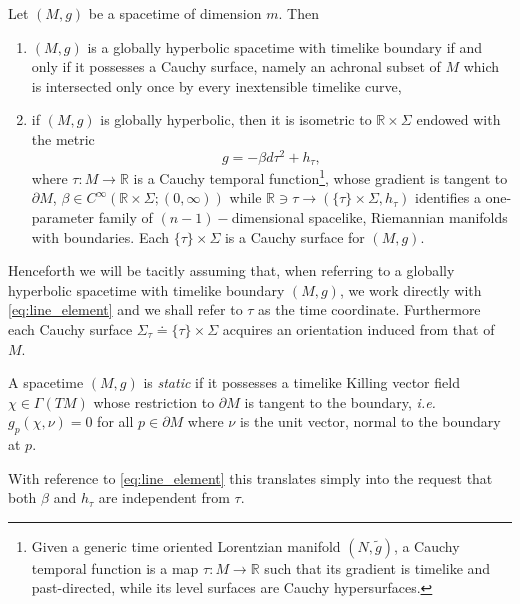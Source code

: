 \begin{theorem}
	Let $(M,g)$ be a spacetime of dimension $m$. Then 
	\begin{enumerate}
		\item $(M,g)$ is a globally hyperbolic spacetime with timelike boundary if and only if it possesses a Cauchy surface, namely an achronal subset of $M$ which is intersected only once by every inextensible timelike curve,
		\item if $(M,g)$ is globally hyperbolic, then it is isometric to $\mathbb{R}\times\Sigma$ endowed with the metric
		\begin{equation}\label{eq:line_element}
		g=-\beta d\tau^2+h_\tau,
		\end{equation}
		where $\tau:M\to\mathbb{R}$ is a Cauchy temporal function\footnote{Given a generic time oriented Lorentzian manifold $(N,\tilde{g})$, a Cauchy temporal function is a map $\tau:M\to\mathbb{R}$ such that its gradient is timelike and past-directed, while its level surfaces are Cauchy hypersurfaces.}, whose gradient is tangent to $\partial M$, $\beta\in C^\infty(\mathbb{R}\times\Sigma;(0,\infty))$ while $\mathbb{R}\ni\tau\to (\{\tau\}\times\Sigma,h_\tau)$ identifies a one-parameter family of $(n-1)-$dimensional spacelike, Riemannian manifolds with boundaries. Each $\{\tau\}\times\Sigma$ is a Cauchy surface for $(M,g)$.
	\end{enumerate}
\end{theorem}


Henceforth we will be tacitly assuming that, when referring to a globally hyperbolic spacetime with timelike boundary $(M,g)$, we work directly with \eqref{eq:line_element} and we shall refer to $\tau$ as the time coordinate. Furthermore each Cauchy surface $\Sigma_\tau\doteq\{\tau\}\times\Sigma$ acquires an orientation induced from that of $M$.

\begin{Definition}
	A spacetime $(M,g)$ is {\em static} if it possesses a timelike Killing vector field $\chi\in\Gamma(TM)$ whose restriction to $\partial M$ is tangent to the boundary, {\it i.e.} $g_p(\chi,\nu)=0$ for all $p\in\partial M$ where $\nu$ is the unit vector, normal to the boundary at $p$.
\end{Definition}
With reference to \eqref{eq:line_element} this translates simply into the request that both $\beta$ and $h_\tau$ are independent from $\tau$.

